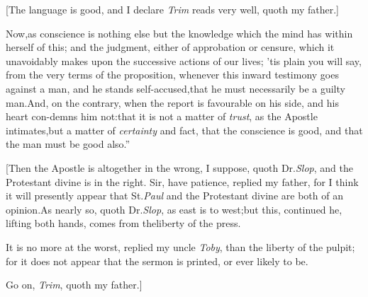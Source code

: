 \documentclass{article}
\begin{document}
[The language is good, and I declare \textit{Trim} reads very
well, quoth my father.]

\begin{story}{Now,\tsk as conscience
    is nothing else} but the
    knowledge which the mind has
    within herself of this; and the
    judgment, either of approbation
    or censure, which it unavoidably
    makes upon the successive
    actions of our lives; ’tis plain
    you will say, from the very
    terms of the proposition,\tsk
    whenever this inward testimony
    goes against a man, and he
    stands self-accused,\tsk that he
    must necessarily be a guilty
    man.\tsk And, on the contrary,
    when the report is fa\-vour\-able on
    his side, and his heart con-\pb demns
    him not:\tsh that it is not a
    matter of \textit{trust}, as the Apostle
    intimates,\tsk but a matter of
    \textit{certainty} and fact,
    that the conscience is good, and
    that the man must be good also.”
\end{story}
\vspace\parskip

[Then the Apostle is altogether in the wrong, I suppose, quoth
Dr.\@ \textit{Slop}, and the Protestant divine is in the right. Sir,
have patience, replied my father, for I think it will presently
appear that St.\@ \textit{Paul} and the Protestant divine are both of
an opinion.\tsk As nearly so, quoth Dr.\@ \textit{Slop}, as east is
to west;\tsk but this, continued he, lifting both hands, comes
from the\break liberty of the press.

It is no more at the worst, replied my uncle \textit{Toby}, than
the liberty of the pulpit; for it does not appear that the sermon is
printed, or ever likely to be.

\newpage
Go on, \textit{Trim}, quoth my father.]
\end{document}
